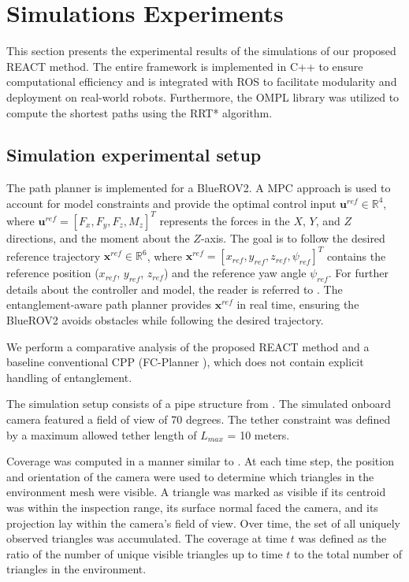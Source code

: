 \section{Simulations Experiments}
\label{sec:simulationexperiments}


This section presents the experimental results of the simulations of our proposed \ac{REACT} method. The entire framework is implemented in C++ to ensure computational efficiency and is integrated with ROS to facilitate modularity and deployment on real-world robots. Furthermore, the \ac{OMPL} library \cite{ompl} was utilized to compute the shortest paths using the RRT* algorithm.  


\subsection{Simulation experimental setup }
The path planner is implemented for a BlueROV2. A \ac{MPC} approach is used to account for model constraints and provide the optimal control input $\mathbf{u}^{ref} \in \mathbb{R}^4$, where $\mathbf{u}^{ref} = [F_x, F_y, F_z, M_z]^T$ represents the forces in the $X$, $Y$, and $Z$ directions, and the moment about the $Z$-axis. The goal is to follow the desired reference trajectory $\mathbf{x}^{ref} \in \mathbb{R}^6$, where $\mathbf{x}^{ref} = [x_{ref}, y_{ref}, z_{ref}, \psi_{ref}]^T$ contains the reference position ($x_{ref}$, $y_{ref}$, $z_{ref}$) and the reference yaw angle $\psi_{ref}$. For further details about the controller and model, the reader is referred to \cite{amergp}. The entanglement-aware path planner provides $\mathbf{x}^{ref}$ in real time, ensuring the BlueROV2 avoids obstacles while following the desired trajectory. 

We perform a comparative analysis of the proposed \ac{REACT} method and a baseline conventional \ac{CPP} (FC-Planner \cite{feng2024fc}), which does not contain explicit handling of entanglement. 

The simulation setup consists of a pipe structure from \cite{feng2024fc}. The simulated onboard camera featured a field of view of 70 degrees. The tether constraint was defined by a maximum allowed tether length of $L_{max}$ = 10 meters.

Coverage was computed in a manner similar to \cite{amer2023visual}. At each time step, the position and orientation of the camera were used to determine which triangles in the environment mesh were visible. A triangle was marked as visible if its centroid was within the inspection range, its surface normal faced the camera, and its projection lay within the camera's field of view. Over time, the set of all uniquely observed triangles was accumulated. The coverage at time $t$ was defined as the ratio of the number of unique visible triangles up to time $t$ to the total number of triangles in the environment.


